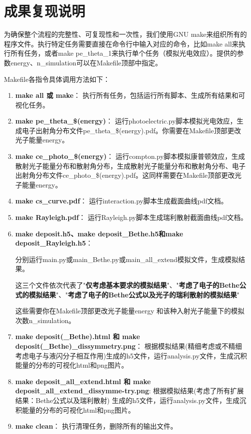 \documentclass[12pt,a4paper]{article}%
\begin{document}
\section{成果复现说明}
为确保整个流程的完整性、可复现性和一次性，我们使用GNU make来组织所有的程序文件。执行特定任务需要直接在命令行中输入对应的命令，比如make all来执行所有任务，或者make pe\_theta\_1来执行单个任务（模拟光电效应）。提供的参数energy、n\_simulation可以在Makefile顶部中指定。\par
Makefile各指令具体调用方法如下：
\begin{tcolorbox}[width=16cm, breakable]
    \begin{enumerate}
        \item \textbf{make all 或 make}：
        执行所有任务，包括运行所有脚本、生成所有结果和可视化任务。
        \item \textbf{make pe\_theta\_\$(energy)}：
        运行photoelectric.py脚本模拟光电效应，生成电子出射角分布文件pe\_theta\_\$(energy).pdf。你需要在Makefile顶部更改光子能量energy。
        \item \textbf{make ce\_photo\_\$(energy)}：
        运行compton.py脚本模拟康普顿效应，生成散射光子能量分布和散射角分布，生成散射光子能量分布和散射角分布、电子出射角分布文件ce\_photo\_\$(energy).pdf。这同样需要在Makefile顶部更改光子能量energy。
        \item \textbf{make cs\_curve.pdf}：
        运行interaction.py脚本生成截面曲线pdf文档。
        \item \textbf{make Rayleigh.pdf}：
        运行Rayleigh.py脚本生成瑞利散射截面曲线pdf文档。
        \item \textbf{make deposit.h5、make deposit\_Bethe.h5和make deposit\_Rayleigh.h5}：\par
        分别运行main.py或main\_Bethe.py或main\_all\_extend模拟文件，生成模拟结果。\par
        这三个文件依次代表了"\textbf{仅考虑基本要求的模拟结果}"、"\textbf{考虑了电子的Bethe公式的模拟结果}"、"\textbf{考虑了电子的Bethe公式以及光子的瑞利散射的模拟结果}"\par
        这些需要你在Makefile顶部更改光子能量energy 和该种入射光子能量下的模拟次数n\_simulation。
        \item \textbf{make deposit(\_Bethe).html 和 make deposit(\_Bethe)\_dissymmetry.png}：
        根据模拟结果(精细考虑或不精细考虑电子与液闪分子相互作用)生成的h5文件，运行analysis.py文件，生成沉积能量的分布的可视化html和png图片。
        \item \textbf{make deposit\_all\_extend.html 和 make deposit\_all\_extend\_dissymme-try.png}:
        根据模拟结果(考虑了所有扩展结果：Bethe公式以及瑞利散射)
        生成的h5文件，运行analysis.py文件，生成沉积能量的分布的可视化html和png图片。
        \item \textbf{make clean}：
        执行清理任务，删除所有的输出文件。
    \end{enumerate}   
\end{tcolorbox}
\end{document}
